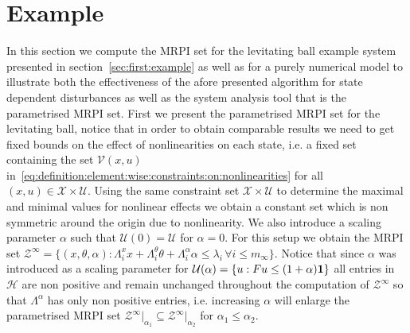 \documentclass[letterpaper, 10pt, conference]{ieeeconf} %
\begin{document}
\section{Example}\label{sec:second:example}
%
%
In this section we compute the MRPI set for the levitating ball example system presented in 
section~\ref{sec:first:example} as well as for a purely numerical model to illustrate both
the effectiveness of the afore presented algorithm for state dependent disturbances as well as
the system analysis tool that is the parametrised MRPI set. First we present the parametrised MRPI
set for the levitating ball, notice that in order to obtain comparable results we need to get fixed bounds
on the effect of nonlinearities on each state, i.e. a fixed set containing the set $\mathcal V(x,u)$ 
in~\eqref{eq:definition:element:wise:constraints:on:nonlinearities} for all $(x,u)\in\mathcal X\times\mathcal U$. 
Using the same constraint set 
$\mathcal X \times \mathcal U$ to determine the maximal and minimal values for nonlinear effects
we obtain a constant set which is non symmetric around the origin due to nonlinearity. We also introduce
a scaling parameter $\alpha$ such that $\mathcal U(0)=\mathcal U$ for $\alpha=0$. For this setup we obtain the MRPI
set $\mathcal Z^\infty=\{(x,\theta,\alpha): \Lambda_i^x x + \Lambda_i^\theta \theta + \Lambda_i^\alpha \alpha\leq
\lambda_i\,\forall i\leq m_\infty\}$. Notice that since $\alpha$ was introduced as a scaling parameter
for $\mathcal U(\alpha)=\{u: Fu\leq (1+\alpha){\bf{1}}\}$ all entries in $\mathcal H$ are non positive and
remain unchanged throughout the computation of $\mathcal Z^\infty$ so that $\Lambda^\alpha$ has only non
positive entries, i.e. increasing $\alpha$ will enlarge the parametrised MRPI set $\mathcal Z^\infty\vert_{\alpha_1}
\subseteq\mathcal Z^\infty\vert_{\alpha_2}$ for $\alpha_1\leq\alpha_2$.
\end{document}

